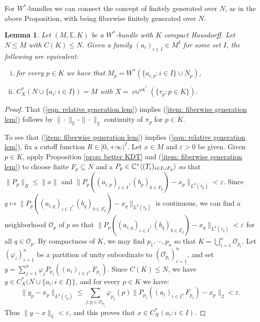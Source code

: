 \documentclass[10pt]{amsart}
\newtheorem{lem}[thm]{Lemma}
\theoremstyle{definition}
\numberwithin{equation}{section}
\newcommand{\bC}{{\mathbb C}}
\newcommand{\bE}{{\mathbb E}}
\DeclareMathOperator{\co}{co}
\DeclarePairedDelimiter{\ip}{\langle}{\rangle}
\begin{document}
For $W^{*}$-bundles we can connect the concept of finitely generated over $N$, as in the above Proposition, with being fiberwise finitely generated over $N$. 


\begin{lem}
Let $(M,\bE,K)$ be a $W^{*}$-bundle with $K$ compact Hausdorff. Let $N\leq M$ with $C(K)\leq N$. Given a family $(a_{i})_{i\in I}\in M^{I}$ for some set $I$, the following are equivalent:
\begin{enumerate}[(i)]
    \item for every $p\in K$ we have that $M_{p}=W^{*}(\{a_{i,p}:i\in I\}\cup N_{p})$, \label{item: fiberwise generation lem}
    \item $C^{*}_{X}(N\cup \{a_{i}:i\in I\})=M$ with $X=\overline{\co}^{wk^{*}}(\{\tau_{p}:p\in K\})$. \label{eqn: relative generation lem}
\end{enumerate}
\end{lem}

\begin{proof}

That (\ref{eqn: relative generation lem}) implies (\ref{item: fiberwise generation lem}) follows by $\|\cdot\|_{\bE}$-$\|\cdot\|_{2}$ continuity of $\pi_{p}$ for $p\in K$.

To see that (\ref{item: fiberwise generation lem}) implies (\ref{eqn: relative generation lem}), fix a cutoff function $R\in [0,+\infty)^{I}$. Let $x\in M$ and $\varepsilon>0$ be given. Given $p\in K$, apply Proposition \ref{prop: better KDT} and (\ref{item: fiberwise generation lem}) to choose  finite $F_{p}\subseteq N$  and a $P_{p}\in \bC^{*}\ip{(T_{i})_{i\in I\cup F_{p}}}$ so that $\|P_{p}\|_{R}\leq \|x\|$ and $\|P_{p}((a_{i,p})_{i\in I},(b_{p})_{b\in F_{p}})-x_{p}\|_{L^{2}(\tau_{p})}<\varepsilon$. Since $q\mapsto \|P_{p}((a_{i,q})_{i\in I},(b_{q})_{b\in F_{p}})-x_{q}\|_{L^{2}(\tau_{q})}$ is continuous, we can find a neighborhood $\mathcal{O}_{p}$ of $p$ so that $\|P_{p}((a_{i,q})_{i\in I},(b_{q})_{b\in F_{p}})-x_{q}\|_{L^{2}(\tau_{q})}<\varepsilon$ for all $q\in \mathcal{O}_{p}$. By compactness of $K$, we may find $p_{1},\cdots,p_{n}$ so that $K=\bigcup_{i=1}^{n}\mathcal{O}_{p_{i}}$. Let $(\varphi_{i})_{i=1}^{n}$ be a partition of unity subordinate to $(\mathcal{O}_{p_{i}})_{i=1}^{n}$, and set $y=\sum_{j=1}^{n}\varphi_{j}P_{p_{j}}((a_{i})_{i\in I},F_{p_{j}})$. Since $C(K)\leq N$, we have $y\in C^{*}_{X}(N\cup \{a_{i}:i\in I\}\}$, and for every $p\in K$ we have:
\[\|y_{p}-x_{p}\|_{L^{2}(\tau_{p})}\leq \sum_{j:p\in \mathcal{O}_{p_{j}}}\varphi_{p_{j}}(p)\|P_{p_{j}}((a_{i})_{i\in I},F_{p_{j}})-x_{p}\|_{2}<\varepsilon.\]
Thus $\|y-x\|_{\bE}<\varepsilon$, and this proves that $x\in C^{*}_{X}(a_{i}:i\in I)$. 
\end{proof}
\end{document}
